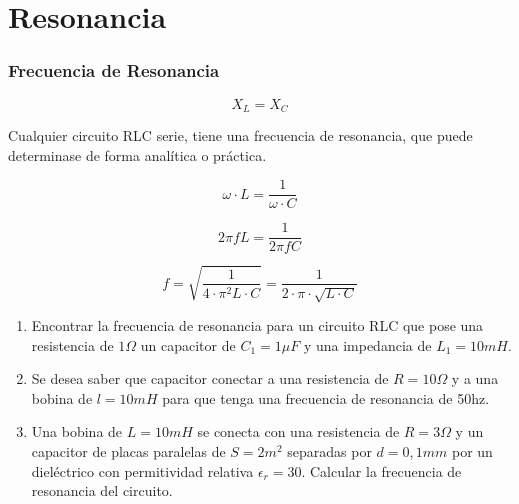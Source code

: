 \documentclass[../main]{subfiles}
\begin{document}
\chapter{Resonancia}





\subsection{Frecuencia de Resonancia}
\begin{equation}
    X_L=X_C
\end{equation}

Cualquier circuito RLC serie, tiene una frecuencia de resonancia, que puede determinase de forma analítica o práctica.

\begin{equation}
    \omega \cdot L = \dfrac{1}{\omega \cdot C}
\end{equation}

\begin{equation}
    2 \pi f L = \dfrac{1}{2 \pi f C}
\end{equation}

\begin{equation}
    f=\sqrt{\dfrac{1}{4\cdot \pi^2L \cdot C}} =\dfrac{1}{2 \cdot \pi \cdot \sqrt{L \cdot C}}  
\end{equation}

\begin{enumerate}
    \item Encontrar la frecuencia de resonancia para un circuito RLC que pose una resistencia de $1\Omega$ un capacitor de $C_1=1 \mu F$ y una impedancia de $L_1=10mH$. 
    \item Se desea saber que capacitor conectar a una resistencia de $R=10\Omega$ y a una bobina de $l=10mH$ para que tenga una frecuencia de resonancia de 50hz.
    \item Una bobina de $L=10mH$ se conecta con una resistencia de $R=3\Omega$ y un capacitor de placas paralelas de $S=2m^2$ separadas por $d=0,1mm$ por un dieléctrico con permitividad relativa $\epsilon_r=30$. Calcular la frecuencia de resonancia del circuito.
\end{enumerate}
\end{document}
